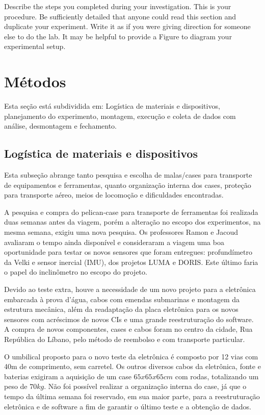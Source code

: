 
Describe the steps you completed during your investigation. This is your procedure. Be sufficiently detailed that anyone could read this section and duplicate your experiment. Write it as if you were giving direction for someone else to do the lab. It may be helpful to provide a Figure to diagram your experimental setup.


\section{Métodos}
Esta seção está subdividida em: Logística de materiais e dispositivos,
planejamento do experimento, montagem, execução e coleta de dados com análise,
desmontagem e fechamento.

\subsection{Logística de materiais e dispositivos}
Esta subseção abrange tanto pesquisa e escolha de malas/cases para
transporte de equipamentos e ferramentas, quanto organização interna dos
cases, proteção para transporte aéreo, meios de locomoção e dificuldades
encontradas.

A pesquisa e compra do pelican-case para transporte de ferramentas foi
realizada duas semanas antes da viagem, porém a alteração no escopo dos experimentos, na mesma
semana, exigiu uma nova pesquisa. Os professores Ramon e Jacoud avaliaram o
tempo ainda disponível e consideraram a viagem uma boa oportunidade para testar
os novos sensores que foram entregues:
profundímetro da Velki e sensor inercial (IMU), dos projetos LUMA e DORIS. Este
último faria o papel do inclinômetro no escopo do projeto. 

Devido ao teste extra, houve a necessidade de um novo projeto para a eletrônica
embarcada à prova d'água, cabos com emendas submarinas e montagem da estrutura mecânica, além da readaptação da placa eletrônica para os novos sensores com acréscimos de novos
CIs e uma grande reestruturação do software. A compra de novos componentes,
cases e cabos foram no centro da cidade, Rua República do Líbano, pelo método de
reembolso e com transporte particular.

O umbilical proposto para o novo teste da eletrônica é composto por 12 vias com
40m de comprimento, sem carretel. Os outros diversos cabos da eletrônica, fonte
e baterias exigiram a aquisição de um case $65x65x65cm$ com rodas, totalizando um
peso de $70kg$. Não foi possível realizar a organização interna do case, já que
o tempo da última semana foi reservado, em sua maior parte, para a
reestruturação eletrônica e de software a fim de garantir o último teste e a
obtenção de dados. 

